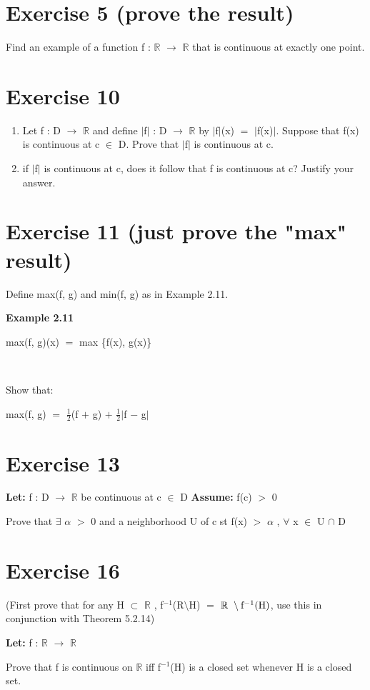\documentclass{article}
\newcommand{\mt}[1]{\ensuremath{#1}}
\newcommand\bsc[2][\DefaultOpt]{%
  \def\DefaultOpt{#2}%
  \section[#1]{#2}%
}
\newcommand{\balist}{\begin{enumerate}[label=\alph*.]}
\newcommand{\elist}{\end{enumerate}}
\newcommand{\lt}[1]{\textbf{Let: } #1}
\newcommand{\as}[1]{\textbf{Assume: } #1}
\newcommand{\br}{\mt{\mathbb{R}} }       %
\newcommand{\fa}{\mt{\forall} }          %
\newcommand{\afa}{\mt{\alpha} }
\newcommand{\mem}{\mt{\in} }
\newcommand{\exs}{\mt{\exists} }
\newcommand{\sbs}{\mt{\subset} }         %
\newcommand{\lra}{ \mt{\longrightarrow} } %
\newcommand{\av}[1]{\mt{|}#1\mt{|}}  %
\newcommand{\bk}[1]{\{#1\}}
\newcommand{\ps}{\mt{+} }
\newcommand{\ms}{\mt{-} }
\newcommand{\gr}{\mt{>} }
\newcommand{\eql}{\mt{=} }
\newcommand{\uf}[2]{#1\mt{^{#2}}}
\newcommand{\frc}[2]{\mt{\frac{#1}{#2}}}
\newcommand{\bnt}[2]{\mt{\textrm{#1}\setminus{\textrm{#2}}}}
\newcommand{\inn}{\mt{\cap} }
\begin{document}
\bsc{Exercise 5 (prove the result)}{

Find an example of a function f : \br \lra \br that is continuous at exactly one point.

}

\bsc{Exercise 10}{

\balist
\item Let f : D \lra \br and define \av{f} : D \lra \br by \av{f}(x) \eql \av{f(x)}. Suppose that f(x) is continuous at c \mem D. Prove that \av{f} is continuous at c.
\item if \av{f} is continuous at c, does it follow that f is continuous at c? Justify your answer.
\elist

}

\bsc{Exercise 11 (just prove the "max" result)}{

Define max(f, g) and min(f, g) as in Example 2.11. 

\textbf{Example 2.11}

max(f, g)(x) \eql max \bk{f(x), g(x)}

\

Show that:

max(f, g) \eql \frc{1}{2}(f \ps g) \ps \frc{1}{2}\av{f \ms g}


}

\bsc{Exercise 13}{

\lt{f : D \lra \br be continuous at c \mem D}
\as{f(c) \gr 0}

Prove that \exs \afa \gr 0 and a neighborhood U of c st f(x) \gr \afa, \fa x \mem U \inn D

}

\bsc{Exercise 16}{

(First prove that for any H \sbs \br, \uf{f}{-1}(\bnt{R}{H}) \eql \bnt{\br}{\uf{f}{-1}(H)}, use this in conjunction with Theorem 5.2.14)

\lt{f : \br \lra \br}

Prove that f is continuous on \br iff \uf{f}{-1}(H) is a closed set whenever H is a closed set.

}
\end{document}
